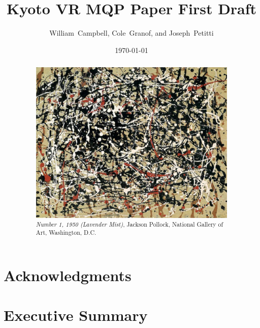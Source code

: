 \documentclass[a4paper, 10pt, american, titlepage]{article}
\title{Kyoto VR MQP Paper First Draft}
\author{William~Campbell, Cole~Granof, and Joseph~Petitti}
\date{\today}
\begin{document}


\maketitle

\begin{abstract}
\begin{figure}[h]
	\centering
	\includegraphics[width=\textwidth]{abstract.jpg}
	\caption[\textit{Number 1, 1950 (Lavender Mist)}, Jackson Pollock]
	{\textit{Number 1, 1950 (Lavender Mist)}, Jackson Pollock, National
		Gallery of Art, Washington, D.C.}
	\label{fig:abstract}
\end{figure}
\end{abstract}

\section*{Acknowledgments}
\label{sec:acknowledgements}


\clearpage

\section*{Executive Summary}
\label{sec:executiveSummary}
\end{document}
